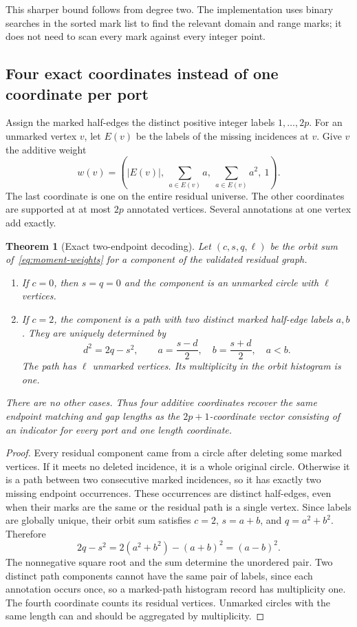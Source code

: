 \documentclass[11pt,letterpaper]{article}
\newtheorem{theorem}{Theorem}[section]
\theoremstyle{definition}
\theoremstyle{remark}
\begin{document}
This sharper bound follows from degree two. The implementation uses binary
searches in the sorted mark list to find the relevant domain and range
marks; it does not need to scan every mark against every integer point.

\subsection{Four exact coordinates instead of one coordinate per port}

Assign the marked half-edges the distinct positive integer labels
$1,\ldots,2p$. For an unmarked vertex $v$, let $E(v)$ be the labels of the
missing incidences at $v$. Give $v$ the additive weight
\begin{equation}
 w(v)=\left(|E(v)|,\ \sum_{a\in E(v)}a,\
                \sum_{a\in E(v)}a^2,\ 1\right).
 \label{eq:moment-weights}
\end{equation}
The last coordinate is one on the entire residual universe. The other
coordinates are supported at at most $2p$ annotated vertices. Several
annotations at one vertex add exactly.

\begin{theorem}[Exact two-endpoint decoding]
\label{thm:moments}
Let $(c,s,q,\ell)$ be the orbit sum of~\eqref{eq:moment-weights} for a
component of the validated residual graph.
\begin{enumerate}
\item If $c=0$, then $s=q=0$ and the component is an unmarked circle
with $\ell$ vertices.
\item If $c=2$, the component is a path with two distinct marked
half-edge labels $a,b$. They are uniquely determined by
\[
 d^2=2q-s^2,
 \qquad a=\frac{s-d}{2},\quad b=\frac{s+d}{2},\quad a<b.
\]
The path has $\ell$ unmarked vertices. Its multiplicity in the orbit
histogram is one.
\end{enumerate}
There are no other cases. Thus four additive coordinates recover the same
endpoint matching and gap lengths as the $2p+1$-coordinate vector consisting
of an indicator for every port and one length coordinate.
\end{theorem}
\begin{proof}
Every residual component came from a circle after deleting some marked
vertices. If it meets no deleted incidence, it is a whole original circle.
Otherwise it is a path between two consecutive marked incidences, so it
has exactly two missing endpoint occurrences. These occurrences are
distinct half-edges, even when their marks are the same or the residual
path is a single vertex. Since labels are globally unique, their orbit
sum satisfies $c=2$, $s=a+b$, and $q=a^2+b^2$. Therefore
\[
 2q-s^2=2(a^2+b^2)-(a+b)^2=(a-b)^2.
\]
The nonnegative square root and the sum determine the unordered pair.
Two distinct path components cannot have the same pair of labels, since
each annotation occurs once, so a marked-path histogram record has
multiplicity one. The fourth coordinate counts its residual vertices.
Unmarked circles with the same length can and should be aggregated by
multiplicity.
\end{proof}
\end{document}
